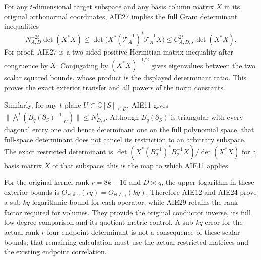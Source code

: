 \documentclass[11pt,a4paper]{article}
\begin{document}
For any $t$-dimensional target subspace and any basis column matrix
$X$ in its original orthonormal coordinates, AIE27 implies the
full Gram determinant inequalities
\[
 N_{A,D}^{-2t}\det(X^*X)
 \le\det\bigl(X^*(\overline{\mathcal T}_A^{-1})^*
                   \overline{\mathcal T}_A^{-1}X\bigr)
 \le C_{A,D,s}^{2t}\det(X^*X).
 \tag{AIE29}
\]
For proof, AIE27 is a two-sided positive Hermitian matrix inequality
after congruence by $X$. Conjugating by $(X^*X)^{-1/2}$ gives
eigenvalues between the two scalar squared bounds, whose product is
the displayed determinant ratio. This proves the exact exterior
transfer and all powers of the norm constants.

Similarly, for any $t$-plane $U\subset\mathbb C[S]_{\le D}$,
AIE11 gives
$\|\bigwedge^t(B_q(\partial_S)^{-1}|_U)\|\le N_{D,s}^t$.
Although $B_q(\partial_S)$ is triangular with every diagonal entry
one and hence determinant one on the full polynomial space, that
full-space determinant does not cancel its restriction to an
arbitrary subspace. The exact restricted determinant is
$\det(X^*(B_q^{-1})^*B_q^{-1}X)/\det(X^*X)$ for a basis matrix
$X$ of that subspace; this is the map to which AIE11 applies.

For the original kernel rank $r=8k-16$ and $D\asymp q$, the upper
logarithm in these exterior bounds is $O_{\mathsf H,\delta,\gamma}(rq)
=O_{\mathsf H,\delta,\gamma}(kq)$. Therefore AIE12 and AIE24 prove
a sub-$kq$ logarithmic bound for each operator, while AIE29 retains
the rank factor required for volumes. They provide the original
conductor inverse, its full low-degree comparison and its quotient
metric control. A sub-$kq$ error for the actual rank-$r$ four-endpoint
determinant is not a consequence of these scalar bounds; that
remaining calculation must use the actual restricted matrices and
the existing endpoint correlation.



\clearpage
\end{document}
